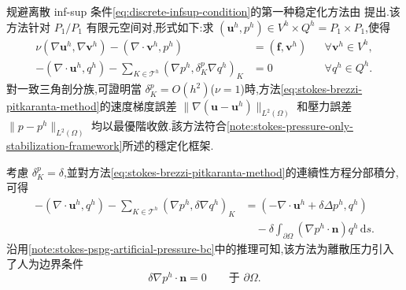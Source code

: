 \begin{note}\label{note:stokes-brezzi-pitkaranta-stabilization}
规避离散 inf-sup 条件\cref{eq:discrete-infsup-condition}的第一种稳定化方法由 \textcite{BrezziPitkaranta1984}提出.该方法针对 $P_1/P_1$ 有限元空间对,形式如下:求 $(\bm{u}^h,p^h)\in V^h\times Q^h=P_1\times P_1$,使得
\begin{equation}\label{eq:stokes-brezzi-pitkaranta-method}
\begin{aligned}
 \nu(\nabla\bm{u}^h,\nabla\bm{v}^h)
   -(\nabla\cdot\bm{v}^h,p^h)
   &=(\bm{f},\bm{v}^h)
     &&\forall\bm{v}^h\in V^h,\\
 -(\nabla\cdot\bm{u}^h,q^h)
   -\sum_{K\in\mathcal{T}^h}
      (\nabla p^h,\delta_K^p\nabla q^h)_K
   &=0
     &&\forall q^h\in Q^h.
\end{aligned}
\end{equation}
對一致三角剖分族,可證明當 $\delta_K^p=O(h^2)$($\nu=1$)時,方法\cref{eq:stokes-brezzi-pitkaranta-method}的速度梯度誤差 $\|\nabla(\bm{u}-\bm{u}^h)\|_{L^2(\Omega)}$ 和壓力誤差 $\|p-p^h\|_{L^2(\Omega)}$ 均以最優階收斂.該方法符合\cref{note:stokes-pressure-only-stabilization-framework}所述的穩定化框架.

考慮 $\delta_K^p=\delta$,並對方法\cref{eq:stokes-brezzi-pitkaranta-method}的連續性方程分部積分,可得
\[
\begin{aligned}
 -(\nabla\cdot\bm{u}^h,q^h)
  -\sum_{K\in\mathcal{T}^h}(\nabla p^h,\delta\nabla q^h)_K
 &=(-\nabla\cdot\bm{u}^h+\delta\Delta p^h,q^h)\\
 &\quad-\delta\int_{\partial\Omega}
     (\nabla p^h\cdot\bm{n})q^h\,\mathrm{d}s.
\end{aligned}
\]
沿用\cref{note:stokes-pspg-artificial-pressure-bc}中的推理可知,该方法为離散压力引入了人为边界条件
\[
 \delta\nabla p^h\cdot\bm{n}=0
 \qquad\text{于 }\partial\Omega.
\]
\end{note}

